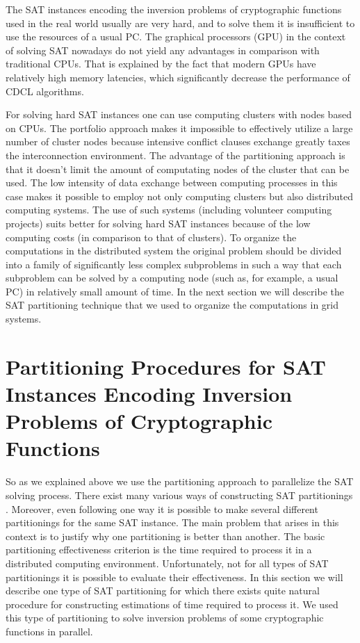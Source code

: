\documentclass[runningheads,a4paper]{llncs}
\begin{document}
The SAT instances encoding the inversion problems of cryptographic functions used in the real world usually are very hard, and to solve them it is insufficient to use the resources of a usual PC. The graphical processors (GPU) in the context of solving SAT nowadays do not yield any advantages in comparison with traditional CPUs. That is explained by the fact that modern GPUs have relatively high memory latencies, which significantly decrease the performance of CDCL algorithms. 

For solving hard SAT instances one can use computing clusters with nodes based on CPUs. The portfolio approach makes it impossible to effectively utilize a large number of cluster nodes because intensive conflict clauses exchange greatly taxes the interconnection environment. The advantage of the partitioning approach is that it doesn't limit the amount of computating nodes of the cluster that can be used. The low intensity of data exchange between computing processes in this case makes it possible to employ not only computing clusters but also distributed computing systems. The use of such systems (including volunteer computing projects) suits better for solving hard SAT instances because of the low computing costs (in comparison to that of clusters). To organize the computations in the distributed system the original problem should be divided into a family of significantly less complex subproblems in such a way that each subproblem can be solved by a computing node (such as, for example, a usual PC) in relatively small amount of time. In the next section we will describe the SAT partitioning technique that we used to organize the computations in grid systems.

\section{Partitioning Procedures for SAT Instances Encoding Inversion Problems of Cryptographic Functions}

So as we explained above we use the partitioning approach to parallelize the SAT solving process. There exist many various ways of constructing SAT partitionings \cite{Hyvarinen11}. Moreover, even following one way it is possible to make several different partitionings for the same SAT instance. The main problem that arises in this context is to justify why one partitioning is better than another. The basic partitioning effectiveness criterion is the time required to process it in a distributed computing environment. Unfortunately, not for all types of SAT partitionings it is possible to evaluate their effectiveness. In this section we will describe one type of SAT partitioning for which there exists quite natural procedure for constructing estimations of time required to process it. We used this type of partitioning to solve inversion problems of some cryptographic functions in parallel.
\end{document}
